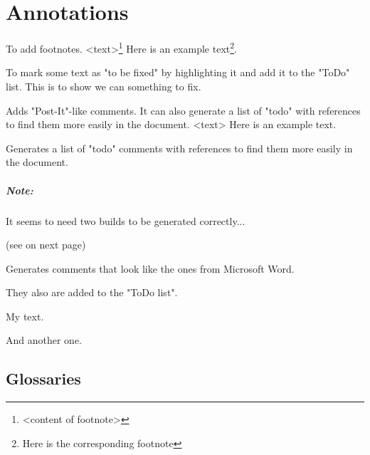 \chapter{Annotations}

{
    To add footnotes.
}
{
    <text>\footnote{<content of footnote>}
}
{
    Here is an example text\footnote {Here is the corresponding footnote}.
}



{
    To mark some text as "to be fixed" by highlighting it and add it to the
    "ToDo" list.
}
{
}
{
    This is to show we can 
    something to fix.
}



{
    Adds "Post-It"-like comments. It can also generate a list of "todo" with
    references to find them more easily in the document.
}
{
    <text>
}
{
    Here is an example text.
}



{
    Generates a list of "todo" comments with references to find them more easily
    in the document.
    \paragraph{Note:} It seems to need two builds to be generated correctly...
}
{
    \listoftodos
}
{
    (see on next page)
    \listoftodos
}



{
    Generates comments that look like the ones from Microsoft Word.

    They also are added to the "ToDo list".
}
{
}
{
    My  text.

    And  another one.
}



\section{
    Glossaries
}

